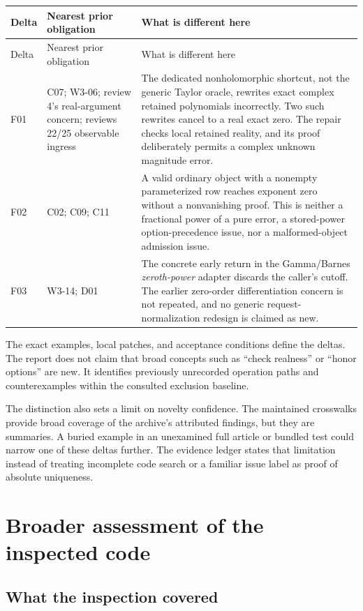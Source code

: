 \documentclass[11pt,letterpaper]{article}
\newcommand{\code}[1]{\texttt{\detokenize{#1}}}
\begin{document}
\begin{longtable}{@{}p{0.4in}p{1.65in}p{4.0in}@{}}
\toprule
Delta & Nearest prior obligation & What is different here\\
\midrule
\endfirsthead
\toprule Delta & Nearest prior obligation & What is different here\\\midrule
\endhead
F01 & C07; W3-06; review 4's real-argument concern; reviews 22/25 observable ingress & The dedicated nonholomorphic \code{Abs} shortcut, not the generic Taylor oracle, rewrites exact complex retained polynomials incorrectly. Two such rewrites cancel to a real exact zero. The repair checks local retained reality, and its proof deliberately permits a complex unknown magnitude error.\\
F02 & C02; C09; C11 & A valid ordinary object with a nonempty parameterized row reaches exponent zero without a nonvanishing proof. This is neither a fractional power of a pure error, a stored-power option-precedence issue, nor a malformed-object admission issue.\\
F03 & W3-14; D01 & The concrete early return in the Gamma/Barnes \emph{zeroth-power} adapter discards the caller's cutoff. The earlier zero-order differentiation concern is not repeated, and no generic request-normalization redesign is claimed as new.\\
\bottomrule
\end{longtable}

The exact examples, local patches, and acceptance conditions define the deltas. The report does not claim that broad concepts such as ``check realness'' or ``honor options'' are new. It identifies previously unrecorded operation paths and counterexamples within the consulted exclusion baseline.

The distinction also sets a limit on novelty confidence. The maintained crosswalks provide broad coverage of the archive's attributed findings, but they are summaries. A buried example in an unexamined full article or bundled test could narrow one of these deltas further. The evidence ledger states that limitation instead of treating incomplete code search or a familiar issue label as proof of absolute uniqueness.

\section{Broader assessment of the inspected code}

\subsection{What the inspection covered}
\end{document}
